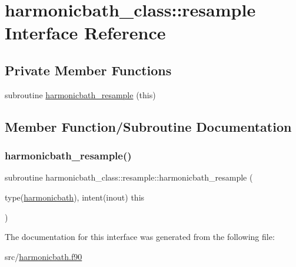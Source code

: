 \hypertarget{interfaceharmonicbath__class_1_1resample}{}\section{harmonicbath\+\_\+class\+:\+:resample Interface Reference}
\label{interfaceharmonicbath__class_1_1resample}
\subsection*{Private Member Functions}
\begin{DoxyCompactItemize}
\item 
subroutine \hyperlink{interfaceharmonicbath__class_1_1resample_a6f6b76d7dc1db9f70a4eedbdd9dd1630}{harmonicbath\+\_\+resample} (this)
\end{DoxyCompactItemize}


\subsection{Member Function/\+Subroutine Documentation}
\mbox{\label{interfaceharmonicbath__class_1_1resample_a6f6b76d7dc1db9f70a4eedbdd9dd1630}} 
\subsubsection{\texorpdfstring{harmonicbath\+\_\+resample()}{harmonicbath\_resample()}}
{\footnotesize\ttfamily subroutine harmonicbath\+\_\+class\+::resample\+::harmonicbath\+\_\+resample (\begin{DoxyParamCaption}\item[{type(\hyperlink{structharmonicbath__class_1_1harmonicbath}{harmonicbath}), intent(inout)}]{this }\end{DoxyParamCaption})\hspace{0.3cm}{\ttfamily [private]}}



The documentation for this interface was generated from the following file\+:\begin{DoxyCompactItemize}
\item 
src/\hyperlink{harmonicbath_8f90}{harmonicbath.\+f90}\end{DoxyCompactItemize}
